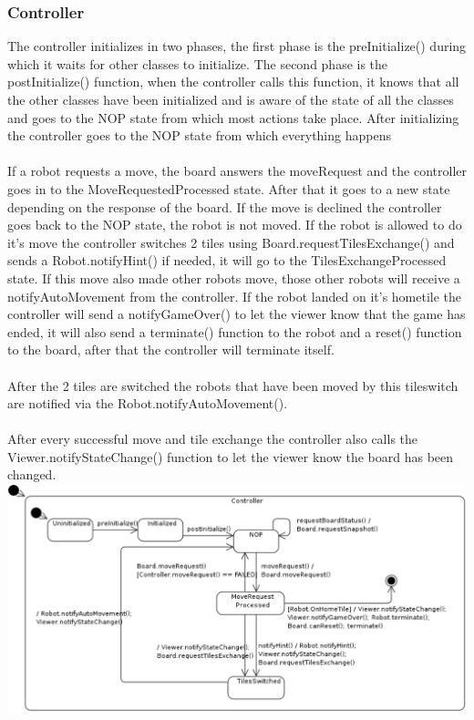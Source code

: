 	\subsubsection{Controller}
	The controller initializes in two phases, the first phase is the preInitialize() during which it waits for other classes to initialize. The second phase is the postInitialize() function, when the controller calls this function, it knows that all the other classes have been initialized and is aware of the state of all the classes and goes to the NOP state from which most actions take place. After initializing the controller goes to the NOP state from which everything happens\\
\\
If a robot requests a move, the board answers the moveRequest and the controller goes in to the MoveRequestedProcessed state. After that it goes to a new state depending on the response of the board. If the move is declined the controller goes back to the NOP state, the robot is not moved. If the robot is allowed to do it's move the controller switches 2 tiles using Board.requestTilesExchange() and sends a Robot.notifyHint() if needed, it will go to the TilesExchangeProcessed state. If this move also made other robots move, those other robots will receive a notifyAutoMovement from the controller. If the robot landed on it's hometile the controller will send a notifyGameOver() to let the viewer know that the game has ended, it will also send a terminate() function to the robot and a reset() function to the board, after that the controller will terminate itself.\\
\\
After the 2 tiles are switched the robots that have been moved by this tileswitch are notified via the Robot.notifyAutoMovement().\\
\\
After every successful move and tile exchange the controller also calls the Viewer.notifyStateChange() function to let the viewer know the board has been changed.\\


	\includegraphics[width=\linewidth]{statecharts/controller.pdf}


